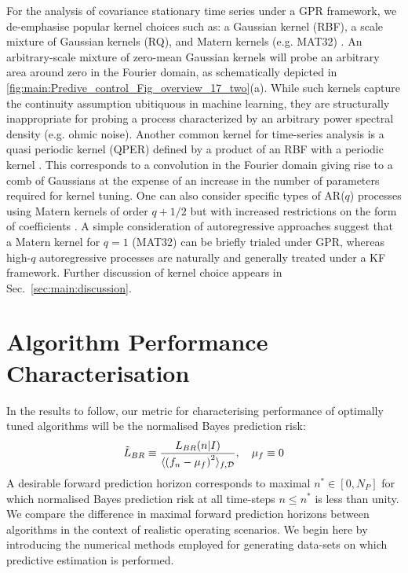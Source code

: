 For the analysis of covariance stationary time series under a GPR framework, we de-emphasise popular kernel choices such as: a Gaussian kernel (RBF),  a scale mixture of Gaussian kernels (RQ), and Matern kernels (e.g. MAT32) \cite{rasmussen2005gaussian,tobar2015learning}. An arbitrary-scale mixture of zero-mean Gaussian kernels will probe an arbitrary area around zero in the Fourier domain, as schematically depicted in \cref{fig:main:Predive_control_Fig_overview_17_two}(a). While such kernels capture the continuity assumption ubitiquous in machine learning, they are structurally inappropriate for probing a process characterized by an arbitrary power spectral density (e.g. ohmic noise). Another common kernel for time-series analysis is a quasi periodic kernel (QPER) defined by a product of an RBF with a periodic kernel \cite{roberts2013gaussian}. This corresponds to a convolution in the Fourier domain giving rise to a comb of Gaussians at the expense of an increase in the number of parameters required for kernel tuning. One can also consider specific types of AR($q$) processes using Matern kernels of order $q+1/2$ but with increased restrictions on the form of coefficients \cite{rasmussen2005gaussian,stein2012interpolation}. A simple consideration of autoregressive approaches suggest that a Matern kernel for $q=1$ (MAT32) can be briefly trialed under GPR, whereas high-$q$ autoregressive processes are naturally and generally treated under a KF framework.  Further discussion of kernel choice appears in Sec.~\ref{sec:main:discussion}.

\section{Algorithm Performance Characterisation \label{sec:main:Performance}}

In the results to follow, our metric for characterising performance of optimally tuned algorithms will be the normalised Bayes prediction risk:
\begin{align}
\tilde{L}_{BR} \equiv \frac{L_{BR}(n|I)}{\langle \left(f_n - \mu_f \right)^2 \rangle_{f, \mathcal{D}}}, \quad \mu_f \equiv 0
\end{align}
A desirable forward prediction horizon corresponds to maximal $n^* \in [0, N_P]$ for which normalised Bayes prediction risk at all time-steps $n \leq n^*$ is less than unity. We compare the difference in maximal forward prediction horizons between algorithms in the context of realistic operating scenarios.  We begin here by introducing the numerical methods employed for generating data-sets on which predictive estimation is performed.

